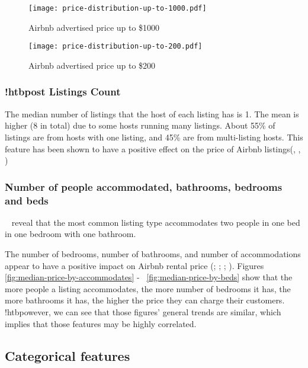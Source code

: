 \begin{figure}[!htbp] \centering
    \texttt{[image: price-distribution-up-to-1000.pdf]}
        \caption{Airbnb advertised price up to \$1000}
        \label{fig:price-distribution-1000}
\end{figure}

\begin{figure}[!htbp] \centering
    \texttt{[image: price-distribution-up-to-200.pdf]}
        \caption{Airbnb advertised price up to \$200}
        \label{fig:price-distribution-200}
\end{figure}

\subsubsection*{!htbpost Listings Count}

The median number of listings that the host of each listing has is 1. The mean
is higher (8 in total) due to some hosts running many listings. About 55\% of
listings are from hosts with one listing, and 45\% are from multi-listing hosts.
This feature has been shown to have a positive effect on the price of Airbnb
listings(\cite{chen2017consumer}, \cite{ert2016trust}, \cite{wang2017price})

\subsubsection*{Number of people accommodated, bathrooms, bedrooms and beds}

~
  reveal that the most common listing type accommodates two people in one bed
  in one
bedroom with one bathroom.

The number of bedrooms, number of bathrooms, and number of accommodations appear
to have a positive impact on Airbnb rental price (\cite{ert2016trust};
\cite{chen2017consumer}; \cite{wang2017price}; \cite{gibbs2018use}). Figures
\ref{fig:median-price-by-accommodates} - ~\ref{fig:median-price-by-beds} show that the more people a listing
accommodates, the more number of bedrooms it has, the more bathrooms it has, the
higher the price they can charge their customers. !htbpowever, we can see that those
figures' general trends are similar, which implies that those features may be
highly correlated.

\subsection{Categorical features}
\label{sec:categorical_features}

